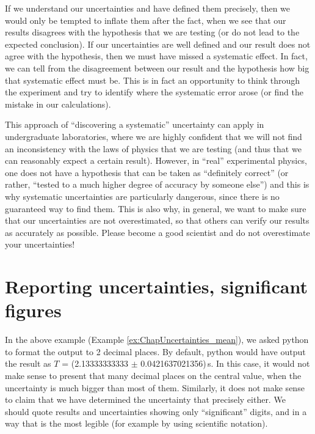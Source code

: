 If we understand our uncertainties and have defined them precisely, then we would only be tempted to inflate them after the fact, when we see that our results disagrees with the hypothesis that we are testing (or do not lead to the expected conclusion). If our uncertainties are well defined and our result does not agree with the hypothesis, then we must have missed a systematic effect. In fact, we can tell from the disagreement between our result and the hypothesis how big that systematic effect must be. This is in fact an opportunity to think through the experiment and try to identify where the systematic error arose (or find the mistake in our calculations).

This approach of ``discovering a systematic'' uncertainty can apply in undergraduate laboratories, where we are highly confident that we will not find an inconsistency with the laws of physics that we are testing (and thus that we can reasonably expect a certain result). However, in ``real'' experimental physics, one does not have a hypothesis that can be taken as ``definitely correct'' (or rather, ``tested to a much higher degree of accuracy by someone else'') and this is why systematic uncertainties are particularly dangerous, since there is no guaranteed way to find them. This is also why, in general, we want to make sure that our uncertainties are not overestimated, so that others can verify our results as accurately as possible. Please become a good scientist and do not overestimate your uncertainties!


\section{Reporting uncertainties, significant figures}
In the above example (Example \ref{ex:ChapUncertainties_mean}), we asked python to format the output to 2 decimal places. By default, python would have output the result as $T$ = (2.13333333333 $\pm$ 0.0421637021356)\,s. In this case, it would not make sense to present that many decimal places on the central value, when the uncertainty is much bigger than most of them. Similarly, it does not make sense to claim that we have determined the uncertainty that precisely either. We should quote results and uncertainties showing only ``significant'' digits, and in a way that is the most legible (for example by using scientific notation).


